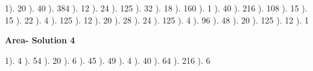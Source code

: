 \documentclass{article}%
\begin{document}
1). 20%
). 40%
). 384%
). 12%
). 24%
). 125%
). 32%
). 18%
). 160%
). 1%
). 40%
). 216%
). 108%
). 15%
). 15%
). 22%
). 4%
). 125%
). 12%
). 20%
). 28%
). 24%
). 125%
). 4%
). 96%
). 48%
). 20%
). 125%
). 12%
). 1%
\newline%
\newpage%
\large%
\begin{center}%
\textbf{Area- Solution 4}%
\newline%
\end{center} \normalsize%
1). 4%
). 54%
). 20%
). 6%
). 45%
). 49%
). 4%
). 40%
). 64%
). 216%
). 6%
\newline%
\end{document}
